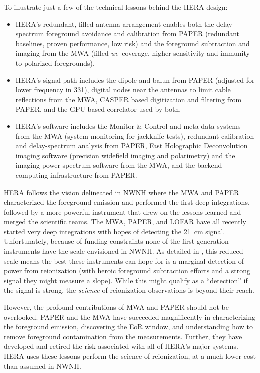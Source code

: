 \documentclass[preprint]{aastex}
\begin{document}
 To illustrate just a few of the technical lessons behind the HERA design:
\begin{itemize}
\setlength{\parskip}{0pt}
\vspace{-7pt}
\item HERA's redundant, filled antenna arrangement enables both the delay-spectrum foreground avoidance and calibration from PAPER (redundant baselines, proven performance, low risk) and the foreground subtraction and imaging from the MWA (filled $uv$~coverage, higher sensitivity and immunity to polarized foregrounds).
\item HERA's signal path includes the dipole and balun from PAPER (adjusted for lower frequency in 331), digital nodes near the antennas to limit cable reflections from the MWA, CASPER based digitization and filtering from PAPER, and the GPU based correlator used by both.
\item HERA's software includes the Monitor \& Control and meta-data systems from the MWA (system monitoring for jackknife tests), redundant calibration and delay-spectrum analysis from PAPER, Fast Holographic Deconvolution imaging software (precision widefield imaging and polarimetry) and the imaging power spectrum software from the MWA, and the backend computing infrastructure from PAPER.
\end{itemize}

HERA follows the vision delineated in NWNH where the MWA and PAPER characterized the foreground emission and performed the first deep integrations, followed by a more powerful instrument that drew on the lessons learned and merged the scientific teams. The MWA, PAPER, and LOFAR have all recently started very deep integrations with hopes of detecting the 21~cm signal. Unfortunately, because of funding constraints none of the first generation instruments have the scale envisioned in NWNH. As detailed in \cite{Jonnie}, this reduced scale means the best these instruments can hope for is a marginal detection of power from reionization (with heroic foreground subtraction efforts and a strong signal they might measure a slope). While this might qualify as a ``detection'' if the signal is strong, the \emph{science} of reionization observations is beyond their reach. 

However, the profound contributions of MWA and PAPER should not be overlooked. PAPER and the MWA have succeeded magnificently in characterizing the foreground emission, discovering the EoR window, and understanding how to remove foreground contamination from the measurements. Further, they have developed and retired the risk associated with all of HERA's major systems. 
HERA uses these lessons perform the science of reionization, at a much lower cost than assumed in NWNH.
\end{document}
